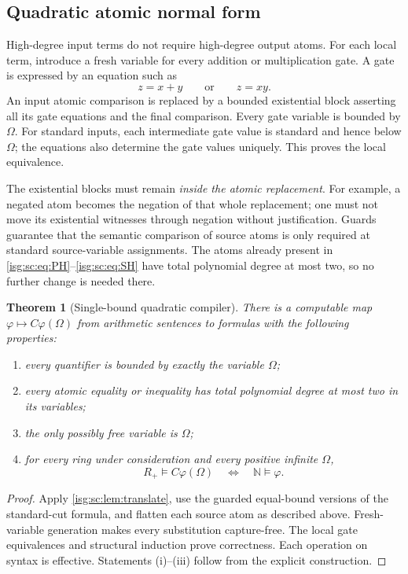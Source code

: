 \documentclass[11pt]{article}
\newtheorem{theorem}{Theorem}[section]
\theoremstyle{definition}
\theoremstyle{remark}
\newcommand{\N}{\mathbb{N}}
\begin{document}
\subsection{Quadratic atomic normal form}
High-degree input terms do not require high-degree output atoms. For each
local term, introduce a fresh variable for every addition or
multiplication gate. A gate is expressed by an equation such as
\[
 z=x+y\qquad\text{or}\qquad z=xy.
\]
An input atomic comparison is replaced by a bounded existential block
asserting all its gate equations and the final comparison. Every gate
variable is bounded by $\Omega$. For standard inputs, each intermediate
gate value is standard and hence below $\Omega$; the equations also
determine the gate values uniquely. This proves the local equivalence.

The existential blocks must remain \emph{inside the atomic replacement}.
For example, a negated atom becomes the negation of that whole
replacement; one must not move its existential witnesses through negation
without justification. Guards guarantee that the semantic comparison of
source atoms is only required at standard source-variable assignments. The
atoms already present in \eqref{isg:sc:eq:PH}--\eqref{isg:sc:eq:SH} have
total polynomial degree at most two, so no further change is needed there.

\begin{theorem}[Single-bound quadratic compiler]\label{isg:sc:thm:compiler}
There is a computable map $\varphi\mapsto C\varphi(\Omega)$ from
arithmetic sentences to formulas with the following properties:
\begin{enumerate}[label=\textup{(\roman*)},nosep]
\item every quantifier is bounded by exactly the variable $\Omega$;
\item every atomic equality or inequality has total polynomial degree at
most two in its variables;
\item the only possibly free variable is $\Omega$;
\item for every ring under consideration and every positive infinite
$\Omega$,
\[
 R_+\models C\varphi(\Omega)\quad\Longleftrightarrow\quad\N\models\varphi.
\]
\end{enumerate}
\end{theorem}
\begin{proof}
Apply \cref{isg:sc:lem:translate}, use the guarded equal-bound versions of
the standard-cut formula, and flatten each source atom as described above.
Fresh-variable generation makes every substitution capture-free. The local
gate equivalences and structural induction prove correctness. Each
operation on syntax is effective. Statements (i)--(iii) follow from the
explicit construction.
\end{proof}
\end{document}
